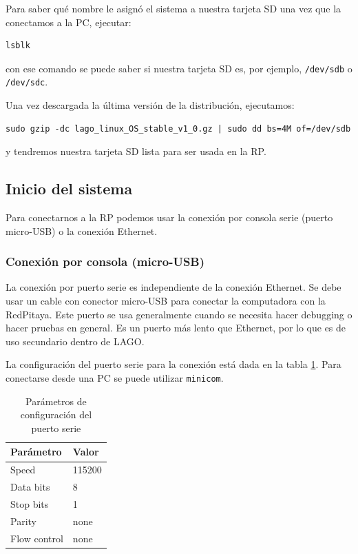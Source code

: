 \documentclass[a4paper,11pt]{article}
\begin{document}
\noindent Para saber qué nombre le asignó el sistema a nuestra tarjeta SD una
vez que la conectamos a la PC, ejecutar:
\begin{verbatim}
lsblk
\end{verbatim}
\noindent con ese comando se puede saber si nuestra tarjeta SD es, por ejemplo,
\texttt{/dev/sdb} o \texttt{/dev/sdc}.

\noindent Una vez descargada la última versión de la distribución, ejecutamos:

\begin{verbatim}
sudo gzip -dc lago_linux_OS_stable_v1_0.gz | sudo dd bs=4M of=/dev/sdb
\end{verbatim}

\noindent y tendremos nuestra tarjeta SD lista para ser usada en la RP.

\subsection{Inicio del sistema}

Para conectarnos a la RP podemos usar la conexión por consola serie (puerto
micro-USB) o la conexión Ethernet.

\subsubsection{Conexión por consola (micro-USB)}

La conexión por puerto serie es independiente de la conexión Ethernet. Se debe
usar un cable con conector micro-USB para conectar la computadora con la
RedPitaya. Este puerto se usa generalmente cuando se necesita hacer debugging o
hacer pruebas en general. Es un puerto más lento que Ethernet, por lo que es de
uso secundario dentro de LAGO. 

La configuración del puerto serie para la
conexión está dada en la tabla \ref{table:uart}. Para conectarse desde una PC se
puede utilizar \texttt{minicom}\cite{bibMinicom}.

\begin{table}[!t]
\renewcommand{\arraystretch}{1.3}
\caption{Parámetros de configuración del puerto serie}
\label{table:uart}
\centering
\begin{tabular}{|l|p{2.0cm}|}
\hline
\bf{Parámetro} & \bf{Valor}\\
\hline\hline
Speed        & 115200\\
Data bits    & 8\\
Stop bits    & 1\\
Parity       & none\\
Flow control & none\\
\hline
\end{tabular}
\end{table}
\end{document}
